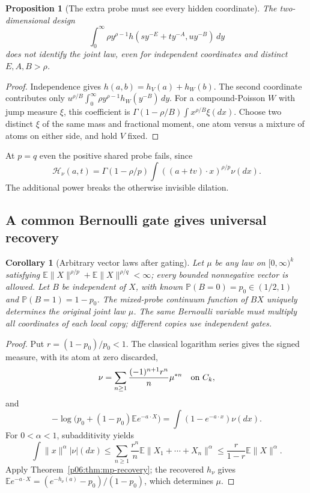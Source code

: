 \documentclass[11pt,letterpaper]{article}
\newtheorem{proposition}[theorem]{Proposition}
\newtheorem{corollary}[theorem]{Corollary}
\theoremstyle{definition}
\theoremstyle{remark}
\newcommand{\1}{\mathbf 1}
\begin{document}
\begin{proposition}[The extra probe must see every hidden coordinate]
\label{p06:prop:mp-wrong-repeat}
The two-dimensional design
\[
 \int_0^\infty\rho y^{\rho-1}
       h(sy^{-E}+ty^{-A},uy^{-B})\,dy
\]
does not identify the joint law, even for independent coordinates
and distinct $E,A,B>\rho$.
\end{proposition}
\begin{proof}
Independence gives $h(a,b)=h_V(a)+h_W(b)$.
The second coordinate contributes only
$u^{\rho/B}\int_0^\infty\rho y^{\rho-1}h_W(y^{-B})\,dy$.
For a compound-Poisson $W$ with jump measure $\xi$, this coefficient
is $\Gamma(1-\rho/B)\int x^{\rho/B}\xi(dx)$.
Choose two distinct $\xi$ of the same mass and fractional moment,
one atom versus a mixture of atoms on either side, and hold $V$ fixed.
\end{proof}

At $p=q$ even the positive shared probe fails, since
\[
 \mathcal H_\nu(a,t)=\Gamma(1-\rho/p)
                  \int((a+tv)\cdot x)^{\rho/p}\nu(dx).
\]
The additional power breaks the otherwise invisible dilation.

\subsection{A common Bernoulli gate gives universal recovery}

\begin{corollary}[Arbitrary vector laws after gating]
\label{p06:cor:mp-gate}
Let $\mu$ be any law on $[0,\infty)^k$ satisfying
$\mathbb E\|X\|^{\rho/p}+\mathbb E\|X\|^{\rho/q}<\infty$;
every bounded nonnegative vector is allowed.
Let $B$ be independent of $X$, with known
$\mathbb P(B=0)=p_0\in(1/2,1)$ and $\mathbb P(B=1)=1-p_0$.
The mixed-probe continuum function of $BX$ uniquely determines
the original joint law $\mu$.
The same Bernoulli variable must multiply all coordinates of each
local copy; different copies use independent gates.
\end{corollary}
\begin{proof}
Put $r=(1-p_0)/p_0<1$. The classical logarithm series gives the
signed measure, with its atom at zero discarded,
\begin{equation}\label{p06:eq:mp-quasi-levy}
 \nu=\sum_{n\ge1}\frac{(-1)^{n+1}r^n}{n}\mu^{*n}
                       \quad\hbox{on }C_k,
\end{equation}
and
\[
 -\log\bigl(p_0+(1-p_0)\mathbb E e^{-a\cdot X}\bigr)
       =\int(1-e^{-a\cdot x})\nu(dx).
\]
For $0<\alpha<1$, subadditivity yields
\[
 \int\|x\|^\alpha|\nu|(dx)
 \le\sum_{n\ge1}\frac{r^n}{n}
       \mathbb E\|X_1+\cdots+X_n\|^\alpha
 \le\frac{r}{1-r}\mathbb E\|X\|^\alpha.
\]
Apply Theorem~\ref{p06:thm:mp-recovery}; the recovered $h_\nu$ gives
$\mathbb E e^{-a\cdot X}=(e^{-h_\nu(a)}-p_0)/(1-p_0)$,
which determines $\mu$.
\end{proof}
\end{document}

